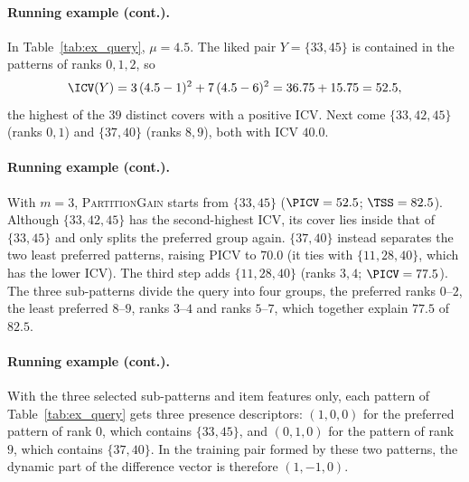 \paragraph{Running example (cont.).}
In Table~\ref{tab:ex_query}, $\mu = 4.5$. The liked pair $Y = \{33, 45\}$ is contained in the patterns of
ranks $0, 1, 2$, so
\begin{equation*}
  \ICV(Y) = 3\,(4.5 - 1)^2 + 7\,(4.5 - 6)^2 = 36.75 + 15.75 = 52.5 ,
\end{equation*}
the highest of the $39$ distinct covers with a positive ICV. Next come $\{33, 42, 45\}$ (ranks $0, 1$) and
$\{37, 40\}$ (ranks $8, 9$), both with ICV $40.0$.

\paragraph{Running example (cont.).}
With $m = 3$, \textsc{PartitionGain} starts from $\{33, 45\}$ ($\PICV = 52.5$; $\TSS = 82.5$). Although
$\{33, 42, 45\}$ has the second-highest ICV, its cover lies inside that of $\{33, 45\}$ and only splits the
preferred group again. $\{37, 40\}$ instead separates the two least preferred patterns, raising PICV to $70.0$
(it ties with $\{11, 28, 40\}$, which has the lower ICV). The third step adds $\{11, 28, 40\}$ (ranks $3, 4$;
$\PICV = 77.5$). The three sub-patterns divide the query into four groups, the preferred ranks $0$--$2$, the
least preferred $8$--$9$, ranks $3$--$4$ and ranks $5$--$7$, which together explain $77.5$ of $82.5$.

\paragraph{Running example (cont.).}
With the three selected sub-patterns and item features only, each pattern of Table~\ref{tab:ex_query} gets
three presence descriptors: $(1, 0, 0)$ for the preferred pattern of rank $0$, which contains $\{33, 45\}$, and
$(0, 1, 0)$ for the pattern of rank $9$, which contains $\{37, 40\}$. In the training pair formed by these two
patterns, the dynamic part of the difference vector is therefore $(1, -1, 0)$.

